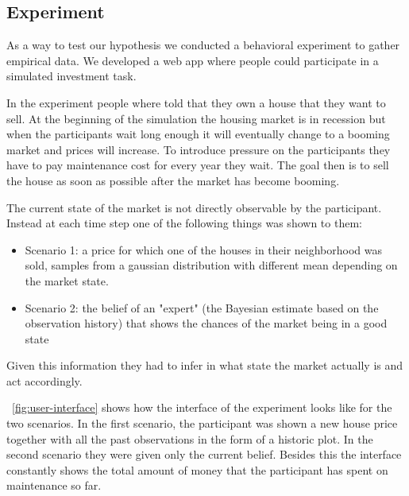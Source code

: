 \subsection{Experiment}

As a way to test our hypothesis we conducted a behavioral experiment to gather empirical data. We developed a web app where people could participate in a simulated investment task.

In the experiment people where told that they own a house that they want to sell. At the beginning of the simulation the housing market is in recession but when the participants wait long enough it will eventually change to a booming market and prices will increase. To introduce pressure on the participants they have to pay maintenance cost for every year they wait.
The goal then is to sell the house as soon as possible after the market has become booming.

The current state of the market is not directly observable by the participant. Instead at each time step one of the following things was shown to them:
\begin{itemize}
    \item Scenario 1: a price for which one of the houses in their neighborhood was sold, samples from a gaussian distribution with different mean depending on the market state.
    \item Scenario 2: the belief of an "expert" (the Bayesian estimate based on the observation history) that shows the chances of the market being in a good state
\end{itemize}

Given this information they had to infer in what state the market actually is and act accordingly.

~\autoref{fig:user-interface} shows how the interface of the experiment looks like for the two scenarios. In the first scenario, the participant was shown a new house price together with all the past observations in the form of a historic plot. In the second scenario they were given only the current belief. Besides this the interface constantly shows the total amount of money that the participant has spent on maintenance so far.

